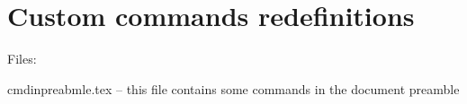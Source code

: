 \section{Custom commands redefinitions}

Files:

cmdinpreabmle.tex -- this file contains some commands in the document preamble

